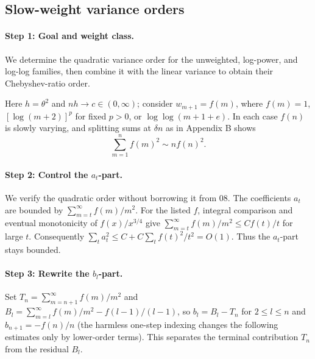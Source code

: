 \documentclass[11pt]{article}
\theoremstyle{definition}
\begin{document}
\subsection{Slow-weight variance orders}\label{app:slow-var}
\paragraph{Step 1: Goal and weight class.}
We determine the quadratic variance order for the unweighted, log-power, and log-log families, then combine it with the linear variance to obtain their Chebyshev-ratio order.

Here $h=\theta^2$ and $nh\to c\in(0,\infty)$; consider $w_{m+1}=f(m)$, where $f(m)=1$, $[\log(m+2)]^p$ for fixed $p>0$, or $\log\log(m+1+e)$. In each case $f(n)$ is slowly varying, and splitting sums at $\delta n$ as in Appendix B shows
\[
\sum_{m=1}^n f(m)^2\sim nf(n)^2.
\]
\paragraph{Step 2: Control the $a_t$-part.}
We verify the quadratic order without borrowing it from 08. The coefficients $a_t$ are bounded by $\sum_{m=t}^\infty f(m)/m^2$. For the listed $f$, integral comparison and eventual monotonicity of $f(x)/x^{3/4}$ give $\sum_{m=t}^\infty f(m)/m^2\le C f(t)/t$ for large $t$. Consequently $\sum_t a_t^2\le C+C\sum_t f(t)^2/t^2=O(1)$. Thus the $a_t$-part stays bounded.

\paragraph{Step 3: Rewrite the $b_l$-part.}
Set $T_n=\sum_{m=n+1}^\infty f(m)/m^2$ and $B_l=\sum_{m=l}^\infty f(m)/m^2-f(l-1)/(l-1)$, so $b_l=B_l-T_n$ for $2\le l\le n$ and $b_{n+1}=-f(n)/n$ (the harmless one-step indexing changes the following estimates only by lower-order terms). This separates the terminal contribution $T_n$ from the residual $B_l$.
\end{document}
